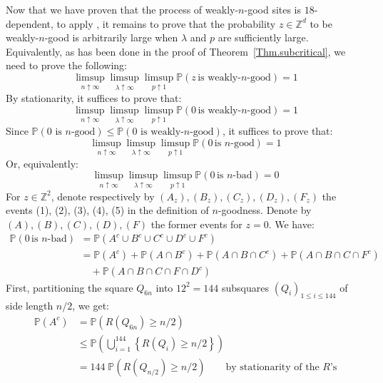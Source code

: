 \documentclass[10pt,a4paper]{amsart}
\theoremstyle{exampstyle}
\theoremstyle{exampnotations}
\begin{document}
Now that we have proven that  the process of weakly-$n$-good sites is $18$-dependent, to apply \cite[Theorem 0.0]{liggett_domination_1997}, it remains to prove that the probability $z \in \mathbb{Z}^{d}$ to be weakly-$n$-good is arbitrarily large when $\lambda$ and $p$ are sufficiently large. Equivalently, as has been done in the proof of Theorem~\ref{Thm.subcritical}, we need to prove the following:
\begin{equation*}
    \limsup_{n \uparrow \infty}\limsup_{\lambda \uparrow \infty}\limsup_{p \uparrow 1} \mathbb{P}(z \, \text{is weakly-$n$-good}) = 1
\end{equation*}
By stationarity, it suffices to prove that: 
\begin{equation*}
\limsup_{n \uparrow \infty}\limsup_{\lambda \uparrow \infty}\limsup_{p \uparrow 1} \mathbb{P}(0 \, \text{is weakly-$n$-good}) = 1
\end{equation*}
Since $ \mathbb{P}(\text{$0$ is $n$-good}) \leq \mathbb{P}(\text{$0$ is weakly-$n$-good})$, it suffices to prove that:
\begin{equation*}
\limsup_{n \uparrow \infty}\limsup_{\lambda \uparrow \infty}\limsup_{p \uparrow 1} \mathbb{P}(0 \, \text{is $n$-good}) = 1
\end{equation*}
Or, equivalently:
\begin{equation*}
\limsup_{n \uparrow \infty}\limsup_{\lambda \uparrow \infty}\limsup_{p \uparrow 1} \mathbb{P}(0 \, \text{is $n$-bad}) = 0
\end{equation*}
For $z \in \mathbb{Z}^{2}$, denote respectively by $(A_z),(B_z), (C_z), (D_z), (F_z)$ the events (1), (2), (3), (4), (5) in the definition of $n$-goodness. Denote by $(A),(B),(C),(D),(F)$ the former events for $z=0$. We have:
\begin{align*}
    \mathbb{P}(0 \, \text{is $n$-bad}) &= \mathbb{P}(A^c \cup B^c \cup C^c \cup D^c \cup F^c)
\\ &= \mathbb{P}(A^c) + \mathbb{P}(A \cap B^c) + \mathbb{P}(A \cap B \cap C^c) + \mathbb{P}(A \cap B \cap C \cap F^c) \\ & \quad + \mathbb{P}(A \cap B \cap C \cap F \cap D^c)
\end{align*}
First, partitioning the square $Q_{6n}$ into $12^2=144$ subsquares $(Q_i)_{1 \leq i \leq 144}$ of side length $n/2$, we get:
\begin{align}
    \nonumber \mathbb{P}(A^c) &= \mathbb{P}(R(Q_{6n}) \geq n/2)
    \\ \nonumber & \leq  \mathbb{P}\left(\bigcup_{i=1}^{144} \left\lbrace  R(Q_i) \geq n/2 \right\rbrace \right)
    \\ \nonumber &= 144 \; \mathbb{P}(R(Q_{n/2}) \geq n/2) \qquad \text{by stationarity of the $R$'s} 
\end{align}
\end{document}

